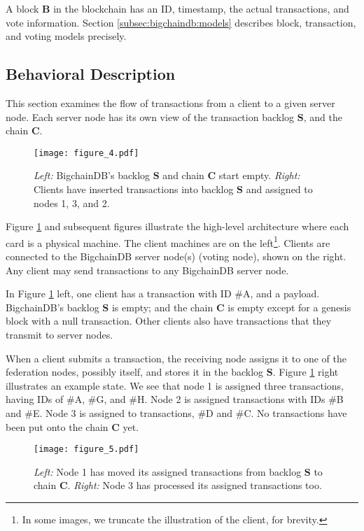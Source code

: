 A block $\mathbf{B}$ in the blockchain has an ID, timestamp, the actual transactions, and vote information. Section \ref{subsec:bigchaindb:models} describes block, transaction, and voting models precisely.

\subsection{Behavioral Description}
This section examines the flow of transactions from a client to a given server node.
Each server node has its own view of the transaction backlog $\mathbf{S}$, and the chain $\mathbf{C}$.

\begin{figure}[!ht]
  \centering
  \texttt{[image: figure\_4.pdf]}
  \caption{\textit{Left:} BigchainDB’s backlog $\mathbf{S}$ and chain $\mathbf{C}$ start empty.
  \textit{Right:} Clients have inserted transactions into backlog $\mathbf{S}$ and assigned to nodes 1, 3, and 2.}
  \label{fig:bigchaindb_architecture_step1}
\end{figure}

Figure \ref{fig:bigchaindb_architecture_step1} and subsequent figures illustrate the high-level architecture where each card is a physical machine.
The client machines are on the left\footnote{In some images, we truncate the illustration of the client, for brevity.}.
Clients are connected to the BigchainDB server node(s) (voting node), shown on the right. Any client may send transactions to any BigchainDB server node.

In Figure \ref{fig:bigchaindb_architecture_step1} left, one client has a transaction with ID \textsf{$\#$A}, and a payload.
BigchainDB’s backlog $\mathbf{S}$ is empty; and the chain $\mathbf{C}$ is empty except for a genesis block with a null transaction.
Other clients also have transactions that they transmit to server nodes.

When a client submits a transaction, the receiving node assigns it to one of the federation nodes, possibly itself, and stores it in the backlog $\mathbf{S}$.
Figure \ref{fig:bigchaindb_architecture_step1} right illustrates an example state.
We see that node 1 is assigned three transactions, having IDs of \textsf{$\#$A}, \textsf{$\#$G}, and \textsf{$\#$H}.
Node 2 is assigned transactions with IDs \textsf{$\#$B} and \textsf{$\#$E}.
Node 3 is assigned to transactions, \textsf{$\#$D} and \textsf{$\#$C}. No transactions have been put onto the chain $\mathbf{C}$ yet.

\begin{figure}[!ht]
  \centering
  \texttt{[image: figure\_5.pdf]}
  \caption{\textit{Left:} Node 1 has moved its assigned transactions from backlog $\mathbf{S}$ to chain $\mathbf{C}$.
  \textit{Right:} Node 3 has processed its assigned transactions too.}
  \label{fig:bigchaindb_architecture_step2}
\end{figure}

